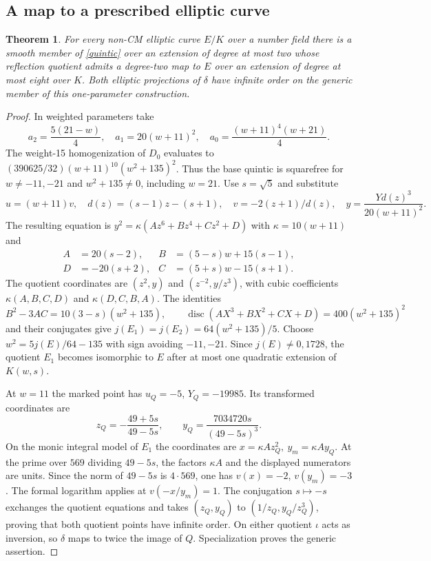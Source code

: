 \documentclass[11pt]{article}
\newtheorem{theorem}{Theorem}[section]
\begin{document}
\subsection{A map to a prescribed elliptic curve}
\begin{theorem}\label{universal}
For every non-CM elliptic curve $E/K$ over a number field there is a
smooth member of \eqref{quintic} over an extension of degree at most two
whose reflection quotient admits a degree-two map to $E$ over an
extension of degree at most eight over $K$. Both elliptic projections
of $\delta$ have infinite order on the generic member of this
one-parameter construction.
\end{theorem}
\begin{proof}
In weighted parameters take
\[
 a_2=\frac{5(21-w)}4,\quad a_1=20(w+11)^2,\quad
 a_0=\frac{(w+11)^4(w+21)}4.
\]
The weight-15 homogenization of $D_0$ evaluates to
$(390625/32)(w+11)^{10}(w^2+135)^2$. Thus the base quintic is squarefree
for $w\ne-11,-21$ and $w^2+135\ne0$, including $w=21$.
Use $s=\sqrt5$ and substitute
\[
 u=(w+11)v,\quad d(z)=(s-1)z-(s+1),\quad
 v=-2(z+1)/d(z),\quad y=\frac{Yd(z)^3}{20(w+11)^2}.
\]
The resulting equation is $y^2=\kappa(Az^6+Bz^4+Cz^2+D)$ with
$\kappa=10(w+11)$ and
\begin{align*}
 A&=20(s-2),& B&=(5-s)w+15(s-1),\\
 D&=-20(s+2),& C&=(5+s)w-15(s+1).
\end{align*}
The quotient coordinates are $(z^2,y)$ and $(z^{-2},y/z^3)$,
with cubic coefficients $\kappa(A,B,C,D)$ and $\kappa(D,C,B,A)$.
The identities
\[
 B^2-3AC=10(3-s)(w^2+135),\qquad
 \operatorname{disc}(AX^3+BX^2+CX+D)=400(w^2+135)^2
\]
and their conjugates give $j(E_1)=j(E_2)=64(w^2+135)/5$. Choose
$w^2=5j(E)/64-135$ with sign avoiding $-11,-21$. Since $j(E)\ne0,1728$,
the quotient $E_1$ becomes isomorphic to $E$ after at most one quadratic
extension of $K(w,s)$.

At $w=11$ the marked point has $u_Q=-5$, $Y_Q=-19985$. Its transformed
coordinates are
\[
 z_Q=-\frac{49+5s}{49-5s},\qquad y_Q=\frac{7034720s}{(49-5s)^3}.
\]
On the monic integral model of $E_1$ the coordinates are
$x=\kappa A z_Q^2,\ y_m=\kappa A y_Q$. At the prime over $569$
dividing $49-5s$, the factors $\kappa A$ and the displayed numerators
are units. Since the norm of $49-5s$ is $4\cdot569$, one has
$v(x)=-2$, $v(y_m)=-3$. The formal logarithm applies at $v(-x/y_m)=1$.
The conjugation $s\mapsto-s$ exchanges the quotient equations and takes
$(z_Q,y_Q)$ to $(1/z_Q,y_Q/z_Q^3)$, proving that both quotient points
have infinite order. On either quotient $\iota$ acts as inversion, so
$\delta$ maps to twice the image of $Q$. Specialization proves the
generic assertion.
\end{proof}
\end{document}
